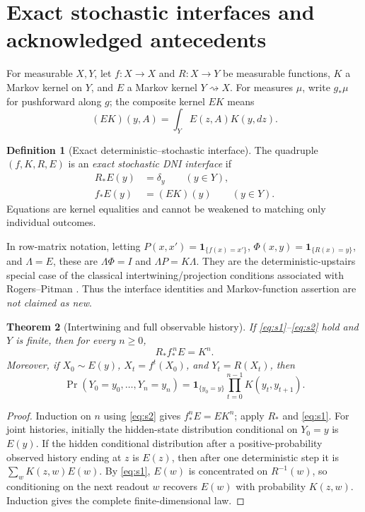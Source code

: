 \documentclass[11pt,letterpaper]{article}
\newtheorem{theorem}{Theorem}[section]
\theoremstyle{definition}\newtheorem{definition}[theorem]{Definition}
\theoremstyle{remark}\newtheorem{remark}[theorem]{Remark}
\newcommand{\D}{\mathcal{D}}
\newcommand{\one}{\mathbf{1}}
\begin{document}
\section{Exact stochastic interfaces and acknowledged antecedents}
For measurable $X,Y$, let $f:X\to X$ and $R:X\to Y$ be measurable functions, $K$ a Markov kernel on $Y$, and $E$ a Markov kernel $Y\rightsquigarrow X$. For measures $\mu$, write $g_*\mu$ for pushforward along $g$; the composite kernel $EK$ means
\[
(EK)(y,A)=\int_Y E(z,A)K(y,dz).
\]
\begin{definition}[Exact deterministic--stochastic interface]\label{def:stochastic}
The quadruple $(f,K,R,E)$ is an \emph{exact stochastic DNI interface} if
\begin{align}
R_*E(y)&=\delta_y\qquad (y\in Y),\tag{S1}\label{eq:s1}\\
 f_*E(y)&=(EK)(y)\qquad (y\in Y).\tag{S2}\label{eq:s2}
\end{align}
Equations are kernel equalities and cannot be weakened to matching only individual outcomes.
\end{definition}
In row-matrix notation, letting $P(x,x')=\one_{\{f(x)=x'\}}$, $\Phi(x,y)=\one_{\{R(x)=y\}}$, and $\Lambda=E$, these are $\Lambda\Phi=I$ and $\Lambda P=K\Lambda$. They are the deterministic-upstairs special case of the classical intertwining/projection conditions associated with Rogers--Pitman \cite{rogers1981,alberts}. Thus the interface identities and Markov-function assertion are \emph{not claimed as new}.
\begin{center}
\end{center}
\begin{theorem}[Intertwining and full observable history]\label{thm:markov}
If \eqref{eq:s1}--\eqref{eq:s2} hold and $Y$ is finite, then for every $n\ge 0$,
\begin{equation}\label{eq:iterate}
R_*f_*^{\,n}E=K^n.
\end{equation}
Moreover, if $X_0\sim E(y)$, $X_t=f^t(X_0)$, and $Y_t=R(X_t)$, then
\[
\Pr(Y_0=y_0,\ldots,Y_n=y_n)=\one_{\{y_0=y\}}\prod_{t=0}^{n-1}K(y_t,y_{t+1}).
\]
\end{theorem}
\begin{proof}
Induction on $n$ using \eqref{eq:s2} gives $f_*^nE=EK^n$; apply $R_*$ and \eqref{eq:s1}. For joint histories, initially the hidden-state distribution conditional on $Y_0=y$ is $E(y)$. If the hidden conditional distribution after a positive-probability observed history ending at $z$ is $E(z)$, then after one deterministic step it is $\sum_w K(z,w)E(w)$. By \eqref{eq:s1}, $E(w)$ is concentrated on $R^{-1}(w)$, so conditioning on the next readout $w$ recovers $E(w)$ with probability $K(z,w)$. Induction gives the complete finite-dimensional law.
\end{proof}
\end{document}
